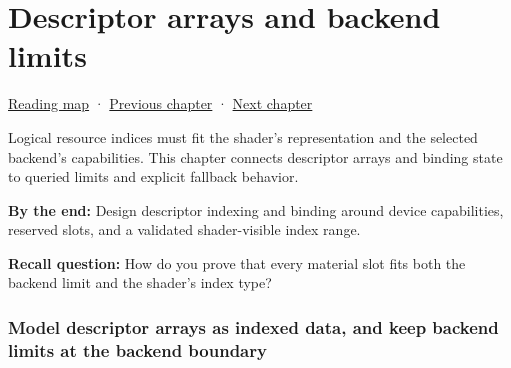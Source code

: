 \chapter{Descriptor arrays and backend limits}\label{06-engine-ii-ch026-descriptor-arrays-and-backend-limits}\hypertarget{06-engine-ii-ch026}{}\label{stagechapter:06-engine-ii-ch026}

\hypertarget{06-engine-ii-ch026-descriptor-arrays-and-backend-limits}{}

\hyperref[volume-reading-map]{Reading map} · \hyperref[06-engine-ii-ch025-renderer-evolution-through-resource-ownership]{Previous chapter} · \hyperref[06-engine-ii-ch027-preparing-and-publishing-runtime-content]{Next chapter}

Logical resource indices must fit the shader's representation and the selected backend's capabilities. This chapter connects descriptor arrays and binding state to queried limits and explicit fallback behavior.

\textbf{By the end:} Design descriptor indexing and binding around device capabilities, reserved slots, and a validated shader-visible index range.

\textbf{Recall question:} How do you prove that every material slot fits both the backend limit and the shader's index type?

\subsection{Model descriptor arrays as indexed data, and keep backend limits at the backend boundary}\label{06-engine-ii-ch026-model-descriptor-arrays-as-indexed-data-and-keep-backend-limits-at-the-backend-boundary}

\hypertarget{06-engine-ii-ch026-model-descriptor-arrays-as-indexed-data-and-keep-backend-limits-at-the-backend-boundary}{}


